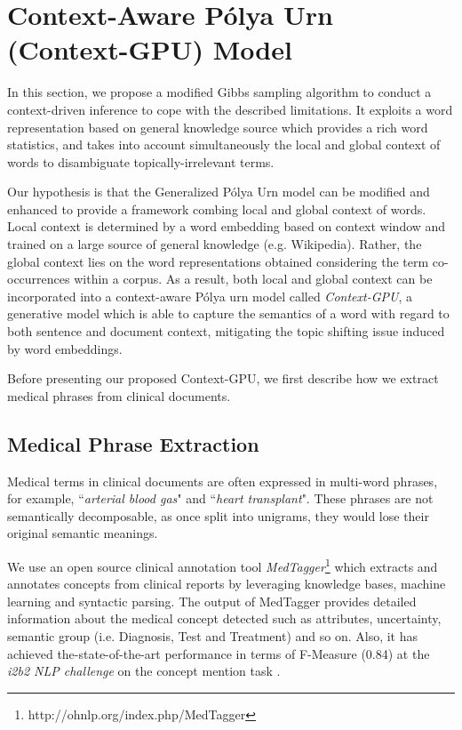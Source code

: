 \documentclass[letterpaper]{article}
\begin{document}
\section{Context-Aware P\'{o}lya Urn  (Context-GPU) Model}

In this section, we propose a modified Gibbs sampling algorithm to conduct a context-driven inference to cope with the described limitations. It exploits a word representation based on general knowledge source which provides a rich word statistics, and takes into account simultaneously the local and global context of words to disambiguate topically-irrelevant terms.

Our hypothesis is that the Generalized P\'{o}lya Urn model can be modified and enhanced to provide a framework combing local and global context of words. Local context is determined by a word embedding based on context window and trained on a large source of general knowledge (e.g. Wikipedia).
Rather, the global context lies on the word representations obtained considering the term co-occurrences within a corpus. As a result, both local and global context can be incorporated into a context-aware P\'{o}lya urn model called \textit{Context-GPU}, a generative model which is able to capture the semantics of a word with regard to both sentence and document context, mitigating the topic shifting issue induced by word embeddings. %

Before presenting our proposed Context-GPU, we first describe how we extract medical phrases from clinical documents.



\subsection{Medical Phrase Extraction}

Medical terms in clinical documents are often expressed in multi-word phrases, for example, ``\textit{arterial blood gas}" and ``\textit{heart transplant}". These phrases are not semantically decomposable, as once split into unigrams, they would lose their original semantic meanings.

We use an open source clinical annotation tool \textit{MedTagger}\footnote{http://ohnlp.org/index.php/MedTagger} which extracts and annotates concepts from clinical reports by leveraging knowledge bases, machine learning and syntactic parsing. The output of MedTagger provides detailed information about the medical concept detected such as attributes, uncertainty, semantic group (i.e. Diagnosis, Test and Treatment) and so on. Also, it has achieved the-state-of-the-art performance in terms of F-Measure (0.84) at the \textit{i2b2 NLP challenge} on the concept mention task \cite{liu12}.
\end{document}
